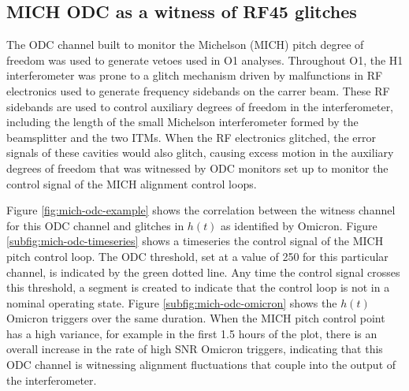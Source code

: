\subsection{MICH ODC as a witness of RF45 glitches}

The ODC channel built to monitor the Michelson (MICH) pitch degree of freedom 
was used to generate vetoes used in O1 analyses. Throughout O1, the H1 
interferometer was prone to a glitch mechanism driven by malfunctions in 
RF electronics used to generate frequency sidebands on the carrer beam. 
These RF sidebands are used to control auxiliary degrees of freedom in the 
interferometer, including the length of the small Michelson interferometer 
formed by the beamsplitter and the two ITMs. When the RF electronics glitched, 
the error signals of these cavities would also glitch, causing excess motion 
in the auxiliary degrees of freedom that was witnessed by ODC monitors set 
up to monitor the control signal of the MICH alignment control loops. 

Figure \ref{fig:mich-odc-example} 
shows the correlation between the witness channel for this ODC channel 
and glitches in $h(t)$ as identified by Omicron. Figure \ref{subfig:mich-odc-timeseries} 
shows a timeseries the control signal of the MICH pitch control loop. The ODC threshold, 
set at a value of 250 for this particular channel, is indicated by the green dotted 
line. Any time the control signal crosses this threshold, a segment is created to 
indicate that the control loop is not in a nominal operating state. Figure 
\ref{subfig:mich-odc-omicron} shows the $h(t)$ Omicron triggers over the same 
duration. When the MICH pitch control point has a high variance, for example 
in the first 1.5 hours of the plot, there is an 
overall increase in the rate of high SNR Omicron triggers, indicating that 
this ODC channel is witnessing alignment fluctuations that couple into the 
output of the interferometer. 

